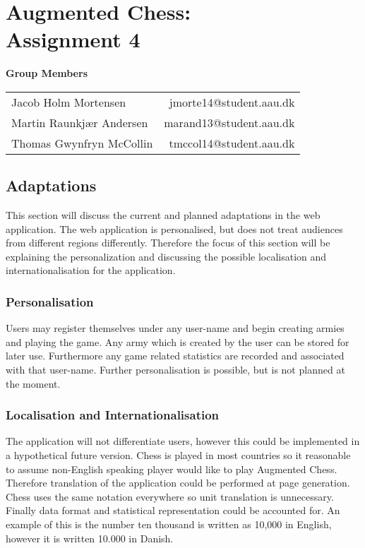 \documentclass[10pt,a4paper]{report}
\begin{document}
\chapter{Augmented Chess:\\ Assignment 4}

\begin{center}
{\Large \textbf{Group Members}}

\begin{tabular}{l r}
Jacob Holm Mortensen		&	jmorte14@student.aau.dk\\
Martin Raunkjær Andersen	&	marand13@student.aau.dk\\
Thomas Gwynfryn McCollin	&	tmccol14@student.aau.dk
\end{tabular}
\end{center}

\section{Adaptations}
This section will discuss the current and planned adaptations in the web application. The web application is personalised, but does not treat audiences from different regions differently. Therefore the focus of this section will be explaining the personalization and discussing the possible localisation and internationalisation for the application.

\subsection{Personalisation}
Users may register themselves under any user-name and begin creating armies and playing the game. Any army which is created by the user can be stored for later use. Furthermore any game related statistics are recorded and associated with that user-name. Further personalisation is possible, but is not planned at the moment.

\subsection{Localisation and Internationalisation}
The application will not differentiate users, however this could be implemented in a hypothetical future version. Chess is played in most countries so it reasonable to assume non-English speaking player would like to play Augmented Chess. Therefore translation of the application could be performed at page generation. Chess uses the same notation everywhere so unit translation is unnecessary. Finally data format and statistical representation could be accounted for. An example of this is the number ten thousand is written as 10,000 in English, however it is written 10.000 in Danish. 
\end{document}
